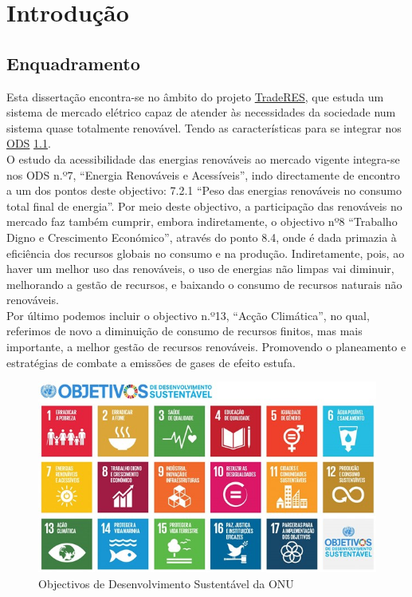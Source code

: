 \chapter{Introdução}

\section{Enquadramento\label{se:enquadramento}}
Esta dissertação encontra-se no âmbito do projeto \href{https://traderes.eu/}{TradeRES}, que estuda um sistema de mercado elétrico capaz de atender às necessidades da sociedade num sistema quase totalmente renovável. Tendo as características para se integrar nos \href{https://ods.pt/ods/}{ODS} \ref{fig:ODS}. \\
O estudo da acessibilidade das energias renováveis ao mercado vigente integra-se nos ODS n.º7, “Energia Renováveis e Acessíveis”, indo directamente de encontro a um dos pontos deste objectivo: 7.2.1 “Peso das energias renováveis no consumo total final de energia”. Por meio deste objectivo, a participação das renováveis no mercado faz também cumprir, embora indiretamente, o objectivo nº8 “Trabalho Digno e Crescimento Económico”, através do ponto 8.4, onde é dada primazia à eficiência dos recursos globais no consumo e na produção. Indiretamente, pois, ao haver um melhor uso das renováveis, o uso de energias não limpas vai diminuir, melhorando a gestão de recursos, e baixando o consumo de recursos naturais não renováveis. \\
Por último podemos incluir o objectivo n.º13, “Acção Climática”, no qual, referimos de novo a diminuição de consumo de recursos finitos, mas mais importante, a melhor gestão de recursos renováveis. Promovendo o planeamento e estratégias de combate a emissões de gases de efeito estufa. \\

\begin{figure}[h]
    \centering
    \includegraphics{Imagens/DesenvolvimentoSustentavel.jpg}
    \caption{Objectivos de Desenvolvimento Sustentável da ONU}
    \label{fig:ODS}
\end{figure}

